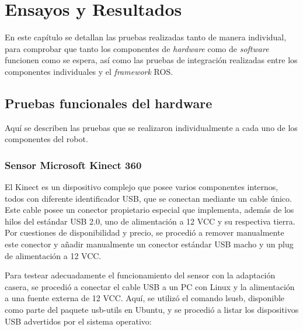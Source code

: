 
\chapter{Ensayos y Resultados}

En este capítulo se detallan las pruebas realizadas tanto de manera individual, para comprobar que tanto los componentes de \textit{hardware} como de \textit{software} funcionen como se espera, así como las pruebas de integración realizadas entre los componentes individuales y el \textit{framework} ROS.

\label{Chapter4}


\section{Pruebas funcionales del hardware}
\label{sec:pruebasHW}

Aquí se describen las pruebas que se realizaron individualmente a cada uno de los componentes del robot.

\subsection{Sensor Microsoft Kinect 360}


El Kinect es un dispositivo complejo que posee varios componentes internos, todos con diferente identificador USB, que se conectan mediante un cable único. Este cable posee un conector propietario especial que implementa, además de los hilos del estándar USB 2.0, uno de alimentación a 12 VCC y su respectiva tierra.
Por cuestiones de disponibilidad y precio, se procedió a remover manualmente este conector y añadir manualmente un conector estándar USB macho y un plug de alimentación a 12 VCC.

Para testear adecuadamente el funcionamiento del sensor con la adaptación casera, se procedió a conectar el cable USB a un PC con Linux y la alimentación a una fuente externa de 12 VCC. Aquí, se utilizó el comando lsusb, disponible como parte del paquete usb-utils en Ubuntu, y se procedió a listar los dispositivos USB advertidos por el sistema operativo:

